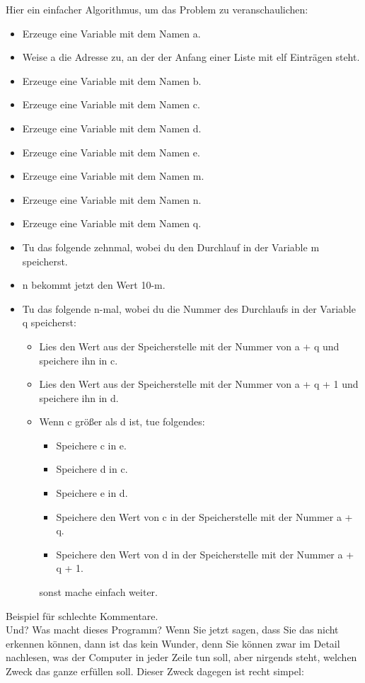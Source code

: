 Hier ein einfacher Algorithmus, um das Problem zu veranschaulichen:
\begin{itemize}
	\item Erzeuge eine Variable mit dem Namen a.
	\item Weise a die Adresse zu, an der der Anfang einer Liste mit elf Einträgen steht.
	\item Erzeuge eine Variable mit dem Namen b.
	\item Erzeuge eine Variable mit dem Namen c.
	\item Erzeuge eine Variable mit dem Namen d.
	\item Erzeuge eine Variable mit dem Namen e.
	\item Erzeuge eine Variable mit dem Namen m.
	\item Erzeuge eine Variable mit dem Namen n.
	\item Erzeuge eine Variable mit dem Namen q.
	\item Tu das folgende zehnmal, wobei du den Durchlauf in der Variable m speicherst.
	\item n bekommt jetzt den Wert 10-m.
	\item Tu das folgende n-mal, wobei du die Nummer des Durchlaufs in der Variable q speicherst:
	\begin{itemize}
		\item Lies den Wert aus der Speicherstelle mit der Nummer von a + q und speichere ihn in c.
		\item Lies den Wert aus der Speicherstelle mit der Nummer von a + q + 1 und speichere ihn in d.
		\item Wenn c größer als d ist, tue folgendes:
		\begin{itemize}
			\item Speichere c in e.
			\item Speichere d in c.
			\item Speichere e in d.
			\item Speichere den Wert von c in der Speicherstelle mit der Nummer a + q.
			\item Speichere den Wert von d in der Speicherstelle mit der Nummer a + q + 1.
		\end{itemize}
		sonst mache einfach weiter. 
	\end{itemize}
\end{itemize}
Beispiel für schlechte Kommentare.\\

Und? Was macht dieses Programm? Wenn Sie jetzt sagen, dass Sie das nicht erkennen können, dann ist das kein Wunder, denn Sie können zwar im Detail nachlesen, was der Computer in jeder Zeile tun soll, aber nirgends steht, welchen Zweck das ganze erfüllen soll. Dieser Zweck dagegen ist recht simpel:\\

